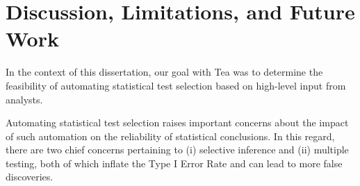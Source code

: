 











\section{Discussion, Limitations, and Future Work} \label{sec:discussionTea} 
In the context of this dissertation, our goal with Tea was to determine the
feasibility of automating statistical test selection based on high-level input
from analysts. 

Automating statistical test selection raises important concerns about the impact
of such automation on the reliability of statistical conclusions. In this
regard, there are two chief concerns pertaining to (i) selective inference and
(ii) multiple testing, both of which inflate the Type I Error Rate and can lead
to more false discoveries. 

